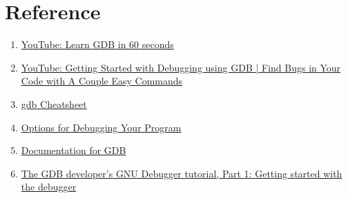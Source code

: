 \section{Reference}
\begin{enumerate}
  \item \href{https://www.youtube.com/watch?v=mfmXcbiRs0E&list=PL9IEJIKnBJjHGWPN_S9NS_Ky1-tC8ZrUI}{YouTube: Learn GDB in 60 seconds}

  \item \href{https://www.youtube.com/watch?v=Dq8l1_-QgAc}{YouTube: Getting Started with Debugging using GDB | Find Bugs in Your Code with A Couple Easy Commands}

  \item \href{https://www.google.com/url?q=https://cs.brown.edu/courses/cs033/docs/guides/gdb.pdf&sa=D&source=docs&ust=1661288718090053&usg=AOvVaw3EbYRk1zHStEJlu-FSbeiY}{gdb Cheatsheet}

  \item \href{https://gcc.gnu.org/onlinedocs/gcc/index.html\#toc-GCC-Command-Options}{Options for Debugging Your Program}

  \item \href{https://sourceware.org/gdb/download/onlinedocs/}{Documentation for GDB}

  \item \href{https://developers.redhat.com/blog/2021/04/30/the-gdb-developers-gnu-debugger-tutorial-part-1-getting-started-with-the-debugger\#}{The GDB developer's GNU Debugger tutorial, Part 1: Getting started with the debugger}
\end{enumerate}
